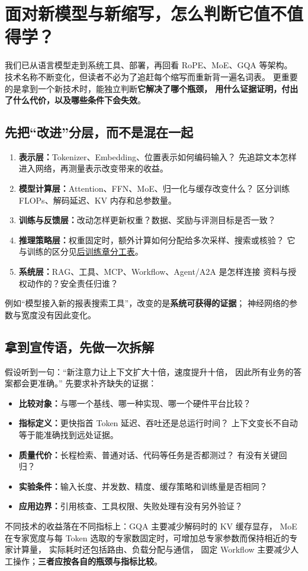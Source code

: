 \chapterrule
\section{面对新模型与新缩写，怎么判断它值不值得学？}
\label{intro:evaluating-models}



我们已从语言模型走到系统工具、部署，再回看 RoPE、MoE、GQA 等架构。
技术名称不断变化，但读者不必为了追赶每个缩写而重新背一遍名词表。
更重要的是拿到一个新技术时，能独立判断\textbf{它解决了哪个瓶颈，
用什么证据证明，付出了什么代价，以及哪些条件下会失效}。

\subsection{先把“改进”分层，而不是混在一起}

\begin{enumerate}
\item \textbf{表示层：}Tokenizer、Embedding、位置表示如何编码输入？
先追踪文本怎样进入网络，再测量表示改变带来的收益。
\item \textbf{模型计算层：}Attention、FFN、MoE、归一化与缓存改变什么？
区分训练 FLOPs、解码延迟、KV 内存和总参数量。
\item \textbf{训练与反馈层：}改动怎样更新权重？数据、奖励与评测目标是否一致？
\item \textbf{推理策略层：}权重固定时，额外计算如何分配给多次采样、搜索或核验？
它与训练的区分见\hyperref[sec:training-inference-roles]{后训练章分工表}。
\item \textbf{系统层：}RAG、工具、MCP、Workflow、Agent/A2A 是怎样连接
资料与授权动作的？安全责任归谁？
\end{enumerate}
例如“模型接入新的报表搜索工具”，改变的是\textbf{系统可获得的证据}；
神经网络的参数与宽度没有因此变化。

\subsection{拿到宣传语，先做一次拆解}

假设听到一句：“新注意力让上下文扩大十倍，速度提升十倍，
因此所有业务的答案都会更准确。”
先要求补齐缺失的证据：
\begin{itemize}
\item \textbf{比较对象：}与哪一个基线、哪一种实现、哪一个硬件平台比较？
\item \textbf{指标定义：}更快指首 Token 延迟、吞吐还是总运行时间？
上下文变长不自动等于能准确找到远处证据。
\item \textbf{质量代价：}长程检索、普通对话、代码等任务是否都测过？
有没有关键回归？
\item \textbf{实验条件：}输入长度、并发数、精度、缓存策略和训练量是否相同？
\item \textbf{应用边界：}引用核查、工具权限、失败处理有没有另外验证？
\end{itemize}
不同技术的收益落在不同指标上：GQA 主要减少解码时的 KV 缓存显存，
MoE 在专家宽度与每 Token 选取的专家数固定时，可增加总专家参数而保持相近的专家计算量，
实际耗时还包括路由、负载分配与通信，
固定 Workflow 主要减少人工操作；\textbf{三者应按各自的瓶颈与指标比较}。

